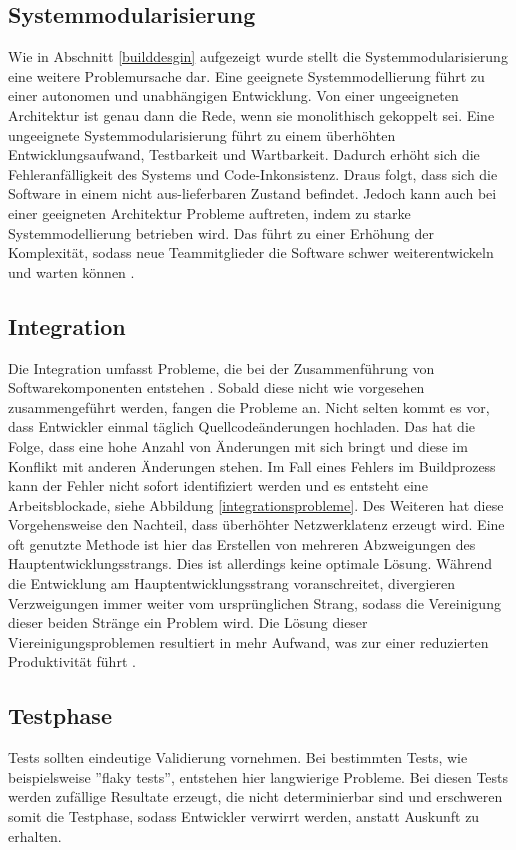 \subsection{Systemmodularisierung}  \label{Systemmodularisierung}
Wie in Abschnitt \ref{builddesgin} aufgezeigt wurde stellt die Systemmodularisierung eine weitere Problemursache dar. Eine geeignete Systemmodellierung führt zu einer autonomen und unabhängigen Entwicklung. Von einer ungeeigneten Architektur ist genau dann die Rede, wenn sie monolithisch gekoppelt sei. Eine ungeeignete Systemmodularisierung führt zu einem überhöhten Entwicklungsaufwand, Testbarkeit und Wartbarkeit. Dadurch erhöht sich die Fehleranfälligkeit des Systems und Code-Inkonsistenz. Draus folgt, dass sich die Software in einem nicht aus-lieferbaren Zustand befindet. Jedoch kann auch bei einer geeigneten Architektur Probleme auftreten, indem zu starke Systemmodellierung betrieben wird. Das führt zu einer Erhöhung der Komplexität, sodass neue Teammitglieder die Software schwer weiterentwickeln und warten können \cite{Laukkanen.2017}. 

\subsection{Integration} \label{Integration}
Die Integration umfasst Probleme, die bei der Zusammenführung von Softwarekomponenten entstehen \cite{LianpingEtPaddy.2015}. Sobald diese nicht wie vorgesehen zusammengeführt werden, fangen die Probleme an. Nicht selten kommt es vor, dass Entwickler einmal täglich Quellcodeänderungen hochladen. Das hat die Folge, dass eine hohe Anzahl von Änderungen mit sich bringt und diese im Konflikt mit anderen Änderungen stehen. Im Fall eines Fehlers im Buildprozess kann der Fehler nicht sofort identifiziert werden und es entsteht eine Arbeitsblockade, siehe Abbildung \ref{integrationsprobleme}. Des Weiteren hat diese Vorgehensweise den Nachteil, dass überhöhter Netzwerklatenz erzeugt wird. Eine oft genutzte Methode ist hier das Erstellen von mehreren Abzweigungen des Hauptentwicklungsstrangs. Dies ist allerdings keine optimale Lösung. Während die Entwicklung am Hauptentwicklungsstrang voranschreitet, divergieren Verzweigungen immer weiter vom ursprünglichen Strang, sodass die Vereinigung dieser beiden Stränge ein Problem wird. Die Lösung dieser Viereinigungsproblemen resultiert in mehr Aufwand, was zur einer reduzierten Produktivität führt \cite{Laukkanen.2017}. 

\subsection{Testphase}
Tests sollten eindeutige Validierung vornehmen. Bei bestimmten Tests, wie beispielsweise ''flaky tests'', entstehen hier langwierige Probleme. Bei diesen Tests werden zufällige Resultate erzeugt, die nicht determinierbar sind und erschweren somit die Testphase, sodass Entwickler verwirrt werden, anstatt Auskunft zu erhalten. 

